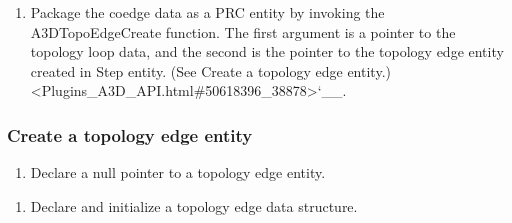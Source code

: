 \documentclass[letterpaper,12pt,english,openany,oneside]{sphinxmanual}
\begin{document}
\begin{sphinxVerbatim}[commandchars=\\\{\}]
            
  
\end{sphinxVerbatim}
\begin{enumerate}
%
\setcounter{enumi}{4}
\item {} 
Package the co\sphinxhyphen{}edge data as a PRC entity by invoking the A3DTopoEdgeCreate function. The first argument is a pointer to the topology loop data, and the second is the pointer to the topology edge entity created in Step  entity. (See Create a topology edge entity.) <Plugins\_A3D\_API.html\#50618396\_38878>`\_\_.

\end{enumerate}

\begin{sphinxVerbatim}[commandchars=\\\{\}]
    
\end{sphinxVerbatim}


\subsubsection{Create a topology edge entity}
\label{\detokenize{Plugins_A3D_API:create-a-topology-edge-entity}}\begin{enumerate}
%
\item {} 
Declare a null pointer to a topology edge entity.

\end{enumerate}

\begin{sphinxVerbatim}[commandchars=\\\{\}]
   
\end{sphinxVerbatim}
\begin{enumerate}
%
\setcounter{enumi}{1}
\item {} 
Declare and initialize a topology edge data structure.

\end{enumerate}
\end{document}
